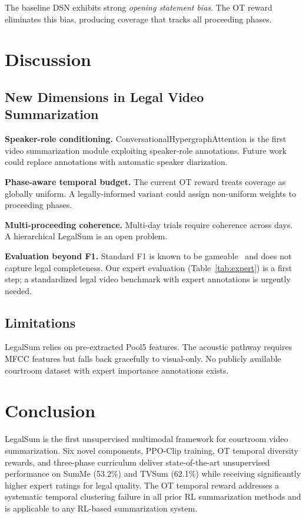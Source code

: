 \documentclass[letterpaper]{article}
\begin{document}
The baseline DSN exhibits strong \textit{opening statement bias}. The OT reward
eliminates this bias, producing coverage that tracks all proceeding phases.

\section{Discussion}

\subsection{New Dimensions in Legal Video Summarization}

\textbf{Speaker-role conditioning.} ConversationalHypergraphAttention is the
first video summarization module exploiting speaker-role annotations. Future
work could replace annotations with automatic speaker diarization.

\textbf{Phase-aware temporal budget.} The current OT reward treats coverage as
globally uniform. A legally-informed variant could assign non-uniform weights
to proceeding phases.

\textbf{Multi-proceeding coherence.} Multi-day trials require coherence across
days. A hierarchical LegalSum is an open problem.

\textbf{Evaluation beyond F1.} Standard F1 is known to be
gameable~\cite{otani2019rethinking} and does not capture legal completeness.
Our expert evaluation (Table~\ref{tab:expert}) is a first step; a standardized
legal video benchmark with expert annotations is urgently needed.

\subsection{Limitations}

LegalSum relies on pre-extracted Pool5 features. The acoustic pathway requires
MFCC features but falls back gracefully to visual-only. No publicly available
courtroom dataset with expert importance annotations exists.

\section{Conclusion}

LegalSum is the first unsupervised multimodal framework for courtroom video
summarization. Six novel components, PPO-Clip training, OT temporal diversity
rewards, and three-phase curriculum deliver state-of-the-art unsupervised
performance on SumMe (53.2\%) and TVSum (62.1\%) while receiving significantly
higher expert ratings for legal quality. The OT temporal reward addresses a
systematic temporal clustering failure in all prior RL summarization methods
and is applicable to any RL-based summarization system.
\end{document}

